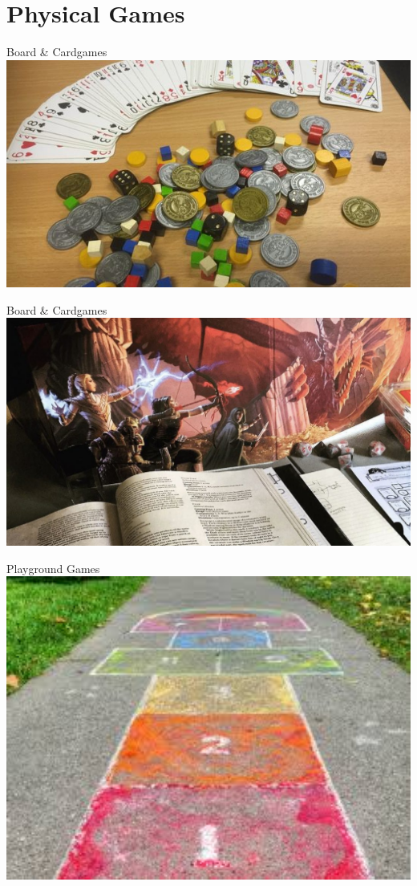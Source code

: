 \part{Physical Games}
\frame{\partpage}

\begin{frame}{Board \& Cardgames}
	\includegraphics[width=1.0\textwidth]{card_boardgames}
\end{frame}

\begin{frame}{Board \& Cardgames}
	\includegraphics[width=1.0\textwidth]{rpg_campaign}
\end{frame}

\begin{frame}{Playground Games}
	\includegraphics[width=1.0\textwidth, height=0.7\textheight]{hop_scotch}
\end{frame}

